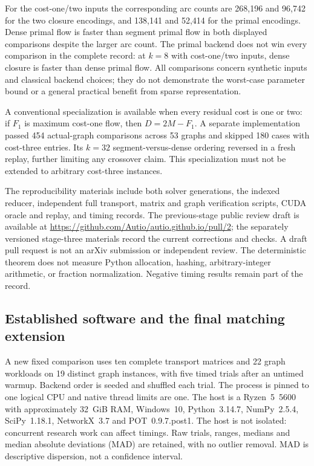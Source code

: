 \documentclass[11pt]{article}
\theoremstyle{remark}
\begin{document}
For the cost-one/two inputs the corresponding arc counts are 268,196 and 96,742 for the two closure encodings, and 138,141 and 52,414 for the primal encodings. Dense primal flow is faster than segment primal flow in both displayed comparisons despite the larger arc count. The primal backend does not win every comparison in the complete record: at $k=8$ with cost-one/two inputs, dense closure is faster than dense primal flow. All comparisons concern synthetic inputs and classical backend choices; they do not demonstrate the worst-case parameter bound or a general practical benefit from sparse representation.

A conventional specialization is available when every residual cost is one or two: if $F_1$ is maximum cost-one flow, then $D=2M-F_1$. A separate implementation passed 454 actual-graph comparisons across 53 graphs and skipped 180 cases with cost-three entries. Its $k=32$ segment-versus-dense ordering reversed in a fresh replay, further limiting any crossover claim. This specialization must not be extended to arbitrary cost-three instances.

The reproducibility materials include both solver generations, the indexed reducer, independent full transport, matrix and graph verification scripts, CUDA oracle and replay, and timing records. The previous-stage public review draft is available at \url{https://github.com/Autio/autio.github.io/pull/2}; the separately versioned stage-three materials record the current corrections and checks. A draft pull request is not an arXiv submission or independent review. The deterministic theorem does not measure Python allocation, hashing, arbitrary-integer arithmetic, or fraction normalization. Negative timing results remain part of the record.

\subsection{Established software and the final matching extension}

A new fixed comparison uses ten complete transport matrices and 22 graph workloads on 19 distinct graph instances, with five timed trials after an untimed warmup. Backend order is seeded and shuffled each trial. The process is pinned to one logical CPU and native thread limits are one. The host is a Ryzen~5~5600 with approximately 32~GiB RAM, Windows~10, Python~3.14.7, NumPy~2.5.4, SciPy~1.18.1, NetworkX~3.7 and POT~0.9.7.post1. The host is not isolated: concurrent research work can affect timings. Raw trials, ranges, medians and median absolute deviations (MAD) are retained, with no outlier removal. MAD is descriptive dispersion, not a confidence interval.
\end{document}
